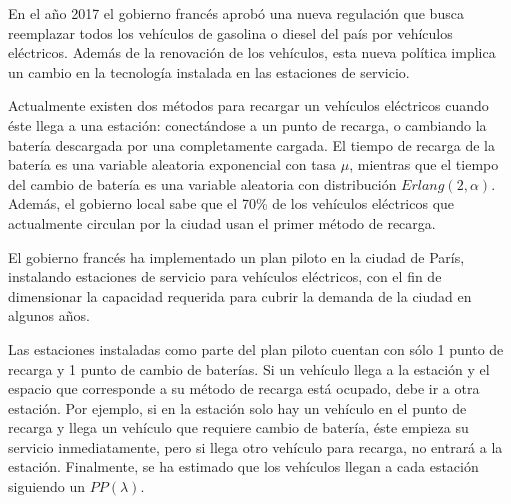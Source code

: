 
En el año 2017 el gobierno francés aprobó una nueva regulación que busca reemplazar todos los vehículos de gasolina o diesel del país por vehículos eléctricos. Además de la renovación de los vehículos, esta nueva política implica un cambio en la tecnología instalada en las estaciones de servicio.

Actualmente existen dos métodos para recargar un vehículos eléctricos cuando éste llega a una estación: conectándose a un punto de recarga, o cambiando la batería descargada por una completamente cargada. El tiempo de recarga de la batería es una variable aleatoria exponencial con tasa $\mu$, mientras que el tiempo del cambio de batería es una variable aleatoria con distribución $Erlang(2,\alpha)$. Además, el gobierno local sabe que el 70\% de los vehículos eléctricos que actualmente circulan por la ciudad usan el primer método de recarga.

El gobierno francés ha implementado un plan piloto en la ciudad de París, instalando estaciones de servicio para vehículos eléctricos, con el fin de dimensionar la capacidad requerida para cubrir la demanda de la ciudad en algunos años.

Las estaciones instaladas como parte del plan piloto cuentan con sólo 1 punto de recarga y 1 punto de cambio de baterías. Si un vehículo llega a la estación y el espacio que corresponde a su método de recarga está ocupado, debe ir a otra estación. Por ejemplo, si en la estación solo hay un vehículo en el punto de recarga y llega un vehículo que requiere cambio de batería, éste empieza su servicio inmediatamente, pero si llega otro vehículo para recarga, no entrará a la estación. Finalmente, se ha estimado que los vehículos llegan a cada estación siguiendo un $PP(\lambda)$.


